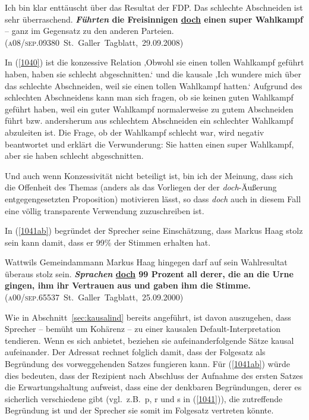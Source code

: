 \begin{exe}
	\ex\label{1040} 

	Ich bin klar enttäuscht über das Resultat der FDP. Das schlechte Abschneiden ist sehr überraschend. \textbf{\textit{Führten} die Freisinnigen 				\ul{doch} einen super Wahlkampf} – ganz im Gegensatz zu den anderen Parteien. 
	\newline\hbox{}\hfill\hbox{(\textsc{a08/sep.09380} St. Galler Tagblatt, 29.09.2008)}
\end{exe}\largerpage
In (\ref{1040}) ist die konzessive Relation ‚Obwohl sie einen tollen Wahlkampf geführt haben, haben sie schlecht abgeschnitten.‘ und die kausale ‚Ich wundere mich über das schlechte Abschneiden, weil sie einen tollen Wahlkampf hatten.‘ Aufgrund des schlechten Abschneidens kann man sich fragen, ob sie keinen guten Wahlkampf geführt haben, weil ein guter Wahlkampf normalerweise zu gutem Abschneiden führt bzw. andersherum aus schlechtem Abschneiden ein schlechter Wahlkampf abzuleiten ist. Die Frage, ob der Wahlkampf schlecht war, wird negativ beantwortet und erklärt die Verwunderung: Sie hatten einen super Wahlkampf, aber sie haben schlecht abgeschnitten.

Und auch wenn Konzessivität nicht beteiligt ist, bin ich der Meinung, dass sich die Offenheit des Themas (anders als das Vorliegen der der \textit{doch}-Äußerung entgegengesetzten Proposition) motivieren lässt, so dass \textit{doch} auch in diesem Fall eine völlig transparente Verwendung zuzuschreiben ist.

In (\ref{1041ab}) begründet der Sprecher seine Einschätzung, dass Markus Haag stolz sein kann damit, dass er 99\% der Stimmen erhalten hat.

\begin{exe}
	\ex\label{1041ab} 

	Wattwils Gemeindammann Markus Haag hingegen darf auf sein Wahlresultat überaus stolz sein. \textbf{\textit{Sprachen} \ul{doch} 99 Prozent all 		derer, die an die Urne gingen, ihm ihr Vertrauen aus und gaben ihm die Stimme.}
	\hfill\hbox{(\textsc{a00/sep.65537} St. Galler Tagblatt, 25.09.2000)}
\end{exe}
Wie in Abschnitt~\ref{sec:kausalind} bereits angeführt, ist davon auszugehen, dass Sprecher – bemüht um Kohärenz – zu einer kausalen Default-Interpretation  tendieren. Wenn es sich anbie\-tet, beziehen sie aufeinanderfolgende Sätze kausal aufeinander. Der Adressat rechnet folglich damit, dass der Folgesatz als Begründung des vorweggehenden Satzes fungieren kann. Für (\ref{1041ab}) würde dies bedeuten, dass der Rezipient nach Abschluss der Aufnahme des ersten Satzes die Erwartungshaltung aufweist, dass eine der denkbaren Begründungen, derer es sicherlich verschiedene gibt (vgl.\ z.B.\ p, r und s in (\ref{1041})), die zutreffende Begründung ist und der Sprecher sie somit im Folgesatz vertreten könnte.

